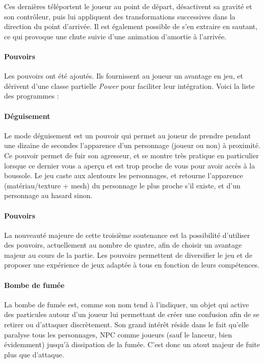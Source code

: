 			Ces dernières téléportent le joueur au point de départ, désactivent 
			sa gravité et son contrôleur, puis lui appliquent des transformations 
			successives dans la direction du point d'arrivée. Il est également possible 
			de s'en extraire en sautant, ce qui provoque une chute suivie d'une animation 
			d'amortie à l'arrivée.

		\paragraph{Pouvoirs}

			Les pouvoirs ont été ajoutés. Ils fournissent au joueur un avantage en jeu, et dérivent d'une classe partielle \textit{Power} 
			pour faciliter leur intégration. Voici la liste des programmes : 

		\paragraph{Déguisement}

			Le mode déguisement est un pouvoir qui permet au joueur de prendre pendant une dizaine de secondes l'apparence 
			d'un personnage (joueur ou non) à proximité. Ce pouvoir permet de fuir son agresseur, et se montre très pratique 
			en particulier lorsque ce dernier vous a aperçu et est trop proche de vous pour avoir accès à la boussole. 
			Le jeu caste aux alentours les personnages, et retourne l'apparence (matériau/texture + mesh) du 
			personnage le plus proche s'il existe, et d'un personnage au hasard sinon.

		\paragraph{Pouvoirs}

			La nouveauté majeure de cette troisième soutenance est la possibilité d'utiliser des pouvoirs, actuellement au 
			nombre de quatre, afin de choisir un avantage majeur au cours de la partie. Les pouvoirs permettent de diversifier 
			le jeu et de proposer une expérience de jeux adaptée à tous en fonction de leurs compétences.

		\paragraph{Bombe de fumée}

			La bombe de fumée est, comme son nom tend à l'indiquer, un objet qui active des particules autour d'un joueur lui 
			permettant de créer une confusion afin de se retirer ou d'attaquer discrètement. Son grand intérêt réside dans le fait 
			qu'elle paralyse tous les personnages, NPC comme joueurs (sauf le lanceur, bien évidemment) jusqu'à dissipation de la fumée. 
			C'est donc un atout majeur de fuite plus que d'attaque.

